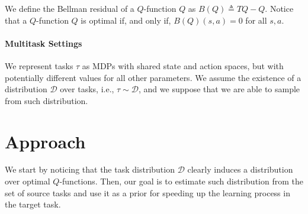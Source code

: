 \documentclass{article}
\begin{document}
We define the Bellman residual of a $Q$-function $Q$ as $B(Q) \triangleq TQ - Q$. Notice that a $Q$-function $Q$ is optimal if, and only if, $B(Q)(s,a) = 0$ for all $s,a$.

\paragraph{Multitask Settings}

We represent tasks $\tau$ as MDPs with shared state and action spaces, but with potentially different values for all other parameters. We assume the existence of a distribution $\mathcal{D}$ over tasks, i.e., $\tau \sim \mathcal{D}$, and we suppose that we are able to sample from such distribution.

\section{Approach}

We start by noticing that the task distribution $\mathcal{D}$ clearly induces a distribution over optimal $Q$-functions. Then, our goal is to estimate such distribution from the set of source tasks and use it as a prior for speeding up the learning process in the target task.
\end{document}
